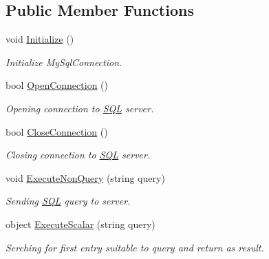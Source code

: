 \subsection*{Public Member Functions}
\begin{DoxyCompactItemize}
\item 
void \mbox{\hyperlink{class_uniform_data_operator_1_1_s_q_l_1_1_my_s_q_l_1_1_my_s_q_l_data_operator_a40f968c5e4fd76b611eba5f59faa16c2}{Initialize}} ()
\begin{DoxyCompactList}\small\item\em Initialize My\+Sql\+Connection. \end{DoxyCompactList}\item 
bool \mbox{\hyperlink{class_uniform_data_operator_1_1_s_q_l_1_1_my_s_q_l_1_1_my_s_q_l_data_operator_acb5a33a4c04bb78290d2ee44ba8479f7}{Open\+Connection}} ()
\begin{DoxyCompactList}\small\item\em Opening connection to \mbox{\hyperlink{namespace_uniform_data_operator_1_1_s_q_l}{S\+QL}} server. \end{DoxyCompactList}\item 
bool \mbox{\hyperlink{class_uniform_data_operator_1_1_s_q_l_1_1_my_s_q_l_1_1_my_s_q_l_data_operator_a91ede325ae734daa6a6fff90cab920bc}{Close\+Connection}} ()
\begin{DoxyCompactList}\small\item\em Closing connection to \mbox{\hyperlink{namespace_uniform_data_operator_1_1_s_q_l}{S\+QL}} server. \end{DoxyCompactList}\item 
void \mbox{\hyperlink{class_uniform_data_operator_1_1_s_q_l_1_1_my_s_q_l_1_1_my_s_q_l_data_operator_a9e565918b8328323520c6e059d8e3d1f}{Execute\+Non\+Query}} (string query)
\begin{DoxyCompactList}\small\item\em Sending \mbox{\hyperlink{namespace_uniform_data_operator_1_1_s_q_l}{S\+QL}} query to server. \end{DoxyCompactList}\item 
object \mbox{\hyperlink{class_uniform_data_operator_1_1_s_q_l_1_1_my_s_q_l_1_1_my_s_q_l_data_operator_a0dbc2a3ee5fb7768868138bbd2d9967e}{Execute\+Scalar}} (string query)
\begin{DoxyCompactList}\small\item\em Serching for first entry suitable to query and return as result. \end{DoxyCompactList}\item 

\end{DoxyCompactItemize}
